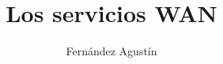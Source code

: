 \documentclass{report}
\title{Los servicios WAN}
\author{Fern\'andez Agust\'in}
\begin{document}
\blindtext
\end{document}
